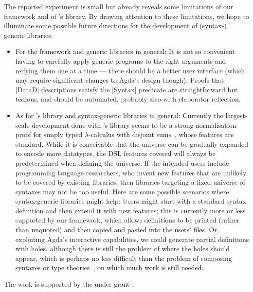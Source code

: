 \documentclass[sigplan,review,fleqn]{acmart}
\renewcommand{\verb}{\collectverb{\color{AgdaFunction}}}
\begin{document}
The reported experiment is small but already reveals some limitations of our framework and of \citeauthor{Allais-generic-syntax}'s library.
By drawing attention to these limitations, we hope to illuminate some possible future directions for the development of (syntax-) generic libraries.
\begin{itemize}[leftmargin=*]
\item For the framework and generic libraries in general:
It is not so convenient having to carefully apply generic programs to the right arguments and reifying them one at a time --- there should be a better user interface (which may require significant changes to Agda's design though).
Proofs that \verb|DataD| descriptions satisfy the \verb|Syntax| predicate are straightforward but tedious, and should be automated, probably also with elaborator reflection.
\item As for \citeauthor{Allais-generic-syntax}'s library and syntax-generic libraries in general:
Currently the largest-scale development done with \citeauthor{Allais-generic-syntax}'s library seems to be a strong normalisation proof for simply typed $\lambda$-calculus with disjoint sums~\citep[Section~4.3]{Abel-POPLMark-reloaded}, whose features are standard.
While it is conceivable that the universe can be gradually expanded to encode more datatypes, the DSL features covered will always be predetermined when defining the universe.
If the intended users include programming language researchers, who invent new features that are unlikely to be covered by existing libraries, then libraries targeting a fixed universe of syntaxes may not be too useful.
Here are some possible scenarios where syntax-generic libraries might help:
Users might start with a standard syntax definition and then extend it with new features; this is currently more or less supported by our framework, which allows definitions to be printed (rather than unquoted) and then copied and pasted into the users' files.
Or, exploiting Agda's interactive capabilities, we could generate partial definitions with holes,  although there is still the problem of where the holes should appear, which is perhaps no less difficult than the problem of composing syntaxes or type theories~\citep{Delaware-meta-theory-a-la-carte,Forster-Coq-a-la-carte}, on which much work is still needed.
\end{itemize}

\begin{acks}
The work is supported by the  under grant .
\end{acks}



%
\end{document}
